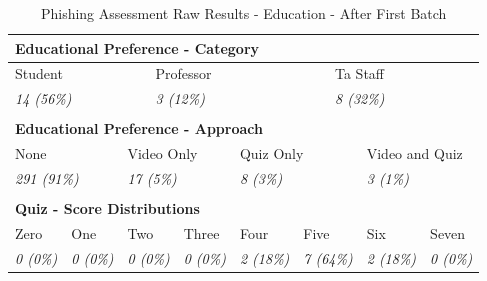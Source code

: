 \documentclass[a4paper]{article}
\begin{document}
\begingroup
\renewcommand{\arraystretch}{1.25}
\begin{table}[ht]
\begin{center}
    \begin{tabular}{ | l | l | l | l | l | l | l | l | l | l | l | l | l | l | l | l | l | l | l | l | l | l | l | l | }
    \hline
    
    \multicolumn{24}{|l|}{\textbf{Educational Preference - Category}} \\ \hline
    \multicolumn{8}{|l|}{Student} & \multicolumn{8}{|l|}{Professor} & \multicolumn{8}{|l|}{Ta Staff} \\ \hline 
    \multicolumn{8}{|l|}{\textit{14 (56\%)}} & \multicolumn{8}{|l|}{\textit{3 (12\%)}} & \multicolumn{8}{|l|}{\textit{8 (32\%)}} \\ \hline
    \multicolumn{24}{l}{}
    \\ \hline
    
    \multicolumn{24}{|l|}{\textbf{Educational Preference - Approach}} \\ \hline
    \multicolumn{6}{|l|}{None} & \multicolumn{6}{|l|}{Video Only} & \multicolumn{6}{|l|}{Quiz Only} & \multicolumn{6}{|l|}{Video and Quiz} \\
    \hline
    \multicolumn{6}{|l|}{\textit{291 (91\%)}} & \multicolumn{6}{|l|}{\textit{17 (5\%)}} & \multicolumn{6}{|l|}{\textit{8 (3\%)}} & \multicolumn{6}{|l|}{\textit{3 (1\%)}} \\ \hline
    \multicolumn{24}{l}{}
    \\ \hline
    
    \multicolumn{24}{|l|}{\textbf{Quiz - Score Distributions}} \\ \hline
    \multicolumn{3}{|l|}{Zero} & \multicolumn{3}{|l|}{One} & \multicolumn{3}{|l|}{Two} & \multicolumn{3}{|l|}{Three} & \multicolumn{3}{|l|}{Four} & \multicolumn{3}{|l|}{Five} & \multicolumn{3}{|l|}{Six} & \multicolumn{3}{|l|}{Seven} \\
    \hline
    \multicolumn{3}{|l|}{\textit{0 (0\%)}} & \multicolumn{3}{|l|}{\textit{0 (0\%)}} & \multicolumn{3}{|l|}{\textit{0 (0\%)}} & \multicolumn{3}{|l|}{\textit{0 (0\%)}} & \multicolumn{3}{|l|}{\textit{2 (18\%)}} & \multicolumn{3}{|l|}{\textit{7 (64\%)}} & \multicolumn{3}{|l|}{\textit{2 (18\%)}} & \multicolumn{3}{|l|}{\textit{0 (0\%)}} \\
    \hline
    
    \end{tabular}
\end{center}
\caption{Phishing Assessment Raw Results - Education - After First Batch}
\label{t-varreact-edu}
\end{table}
\end{document}
